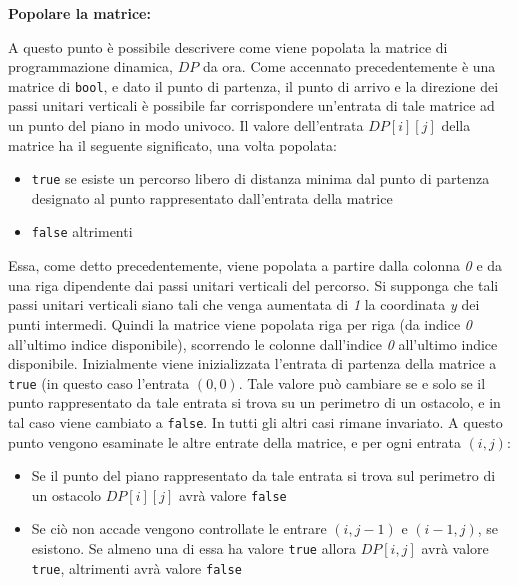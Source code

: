 \documentclass[a4paper,11pt]{article}
\begin{document}
\textbf{Popolare la matrice:}

A questo punto è possibile descrivere come viene popolata la matrice di programmazione dinamica, $DP$ da ora. Come accennato precedentemente è una matrice di \texttt{bool}, e dato il punto di partenza, il punto di arrivo e la direzione dei passi unitari verticali è possibile far corrispondere un'entrata di tale matrice ad un punto del piano in modo univoco. Il valore dell'entrata $DP[i][j]$ della matrice ha il seguente significato, una volta popolata:


\begin{itemize}
    \item \texttt{true} se esiste un percorso libero di distanza minima dal punto di partenza designato al punto rappresentato dall'entrata della matrice

    \item \texttt{false} altrimenti
\end{itemize}

Essa, come detto precedentemente, viene popolata a partire dalla colonna \textit{0} e da una riga dipendente dai passi unitari verticali del percorso. Si supponga che tali passi unitari verticali siano tali che venga aumentata di \textit{1} la coordinata \textit{y} dei punti intermedi. Quindi la matrice viene popolata riga per riga (da indice \textit{0} all'ultimo indice disponibile), scorrendo le colonne dall'indice \textit{0} all'ultimo indice disponibile. Inizialmente viene inizializzata l'entrata di partenza della matrice a \texttt{true} (in questo caso l'entrata $(0, 0)$. Tale valore può cambiare se e solo se il punto rappresentato da tale entrata si trova su un perimetro di un ostacolo, e in tal caso viene cambiato a \texttt{false}. In tutti gli altri casi rimane invariato. A questo punto vengono esaminate le altre entrate della matrice, e per ogni entrata $(i, j)$:

\begin{itemize}
    \item Se il punto del piano rappresentato da tale entrata si trova sul perimetro di un ostacolo $DP[i][j]$ avrà valore \texttt{false}

    \item Se ciò non accade vengono controllate le entrare $(i, j-1)$ e $(i-1, j)$, se esistono. Se almeno una di essa ha valore \texttt{true} allora $DP[i, j]$ avrà valore \texttt{true}, altrimenti avrà valore \texttt{false}
\end{itemize}
\end{document}
